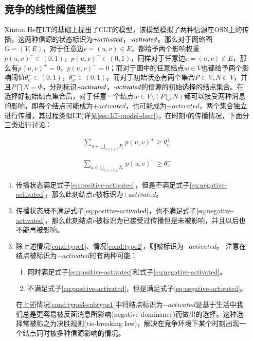 \subsection{竞争的线性阈值模型}
\label{sec:CLT-model-desc}
Xinran He\cite{he2012influence}在LT的基础上提出了CLT的模型，该模型模拟了两种信源在OSN上的传播，这两种信源的状态标识为$\emph{+activated}$，$\emph{-activated}$。那么对于网络图$G=(V,E)$，对于任意边$e=(u, v) \in E$，都给予两个影响权重$p(u,v)^{+} \in (0, 1)$，$p(u,v)^{-} \in (0, 1)$，同样对于任意边$e=(u,v) \notin E$，那么有$p(u,v)^{+}=0$，$p(u,v)^{-}=0$；而对于图中的任意结点$w \in V$也都给予两个影响阈值$\theta_{w}^{+} \in (0, 1)$，$\theta_{w}^{-} \in (0, 1)$。而对于初始状态有两个集合$P \subset V, N \subset V$，并且$P \bigcap N = \Phi$，分别标识$\emph{+activated}$，$\emph{-activated}$的信源的初始选择的结点集合。在选择好初始结点集合后，对于任意一个结点$w \in V \setminus (P \bigcup N)$都可以接受两种消息的影响，即每个结点可能成为$+activated$，也可能成为$-activated$，两个集合独立进行传播，其过程类似LT(详见\ref{sec:LT-model-desc})。在时刻$t$的传播情况，下面分三类进行讨论：


\begin{equation}
\label{eq:positive-activated} 
	\begin{aligned}
		{\sum_{u \in \bigcup_{0 \leq i \leq t}P_{i}}p(u,v)^{+} \geq \theta_{v}^{+}}
	\end{aligned}
\end{equation}

\begin{equation} 
\label{eq:negative-activated} 
	\begin{aligned}
		{\sum_{u \in \bigcup_{0 \leq i \leq t}N_{i}}p(u,v)^{-} \geq \theta_{v}^{-}}
	\end{aligned}
\end{equation}


\begin{enumerate}
\item \label{cond:type1} 传播状态满足式子\ref{eq:positive-activated}，但是不满足式子\ref{eq:negative-activated}，那么此刻结点$v$被标识为$+activated$。
\item \label{cond:type2} 传播状态既不满足式子\ref{eq:positive-activated}，也不满足式子\ref{eq:negative-activated}，那么此刻结点$v$被标识为已接受过传播但是未被影响，并且以后也不能再被影响。
\item \label{cond:type3} 除上述情况\ref{cond:type1}、情况\ref{cond:type2}，则被标识为$-activated$。
注意在结点被标识为$-activated$时有两种可能：
\begin{enumerate}
	\item \label{cond:type3-subtype1} 同时满足式子\ref{eq:positive-activated}和式子\ref{eq:negative-activated}。
	\item \label{cond:type3-subtype2} 不满足式子\ref{eq:positive-activated}，但是满足式子\ref{eq:negative-activated}。
\end{enumerate}
在上述情况\ref{cond:type3-subtype1}中将结点标识为$-activated$是基于生活中我们总是更容易被反面消息所影响(negative dominance)而做出的选择。这种选择常被称之为决胜规则(tie-breaking law)，解决在竞争环境下某个时刻出现一个结点同时被多种信源影响的情况。
\end{enumerate}


